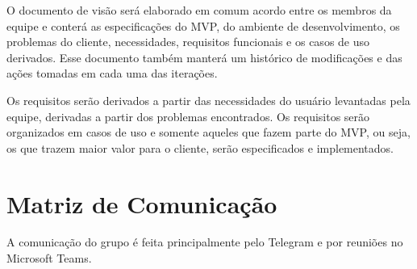 \documentclass[
	12pt,				%
	oneside,			%
	a4paper,			%
	english,			%
	brazil,				%
	]{abntex2}
\begin{document}
O documento de visão será elaborado em comum acordo entre os membros da equipe e conterá as especificações do MVP, do ambiente de desenvolvimento, os problemas do cliente, necessidades, requisitos funcionais e os casos de uso derivados. Esse documento também manterá um histórico de modificações e das ações tomadas em cada uma das iterações.

Os requisitos serão derivados a partir das necessidades do usuário levantadas pela equipe, derivadas a partir dos problemas encontrados. Os requisitos serão organizados em casos de uso e somente aqueles que fazem parte do MVP, ou seja, os que trazem maior valor para o cliente, serão especificados e implementados.


\section{Matriz de Comunicação}
A comunicação do grupo é feita principalmente pelo Telegram e por reuniões no Microsoft Teams.
\end{document}
